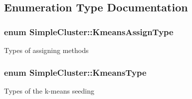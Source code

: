 \subsection{Enumeration Type Documentation}
\hypertarget{namespaceSimpleCluster_a1ad2d6129171ff9a5ee57f48b5f3f6e1}{
\subsubsection[{Kmeans\-Assign\-Type}]{\setlength{\rightskip}{0pt plus 5cm}enum {\bf Simple\-Cluster\-::\-Kmeans\-Assign\-Type}\hspace{0.3cm}{\ttfamily [strong]}}}\label{namespaceSimpleCluster_a1ad2d6129171ff9a5ee57f48b5f3f6e1}
Types of assigning methods \hypertarget{namespaceSimpleCluster_a8a8f57121b69a7b43575e4d6a53928e2}{
\subsubsection[{Kmeans\-Type}]{\setlength{\rightskip}{0pt plus 5cm}enum {\bf Simple\-Cluster\-::\-Kmeans\-Type}\hspace{0.3cm}{\ttfamily [strong]}}}\label{namespaceSimpleCluster_a8a8f57121b69a7b43575e4d6a53928e2}
Types of the k-\/means seeding 

